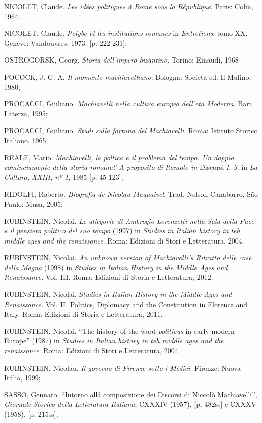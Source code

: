 \begin{Parskip}
NICOLET, Claude. \emph{Les idées politiques à Rome sous la République}.
Paris: Colin, 1964.

NICOLET, Claude. \emph{Polybe et les institutions romanes} in
\emph{Entretiens}, tomo XX. Geneve: Vandouvres, 1973. {[}p. 222-231{]};

OSTROGORSK, Georg. \emph{Storia dell'impero bizantino.} Torino: Einaudi,
1968

POCOCK, J. G. A. \emph{Il momento machiavelliano}. Bologna: Società ed.
Il Mulino, 1980;

PROCACCI, Giuliano. \emph{Machiavelli nella cultura europea dell'eta
Moderna}. Bari: Laterza, 1995;

PROCACCI, Guiliano. \emph{Studi sulla fortuna del Machiavelli}. Roma:
Istituto Storico Italiano. 1965;

REALE, Mario. \emph{Machiavelli, la poltica e il problema del tempo. Un
doppio cominciamente della storia romana? A proposito di Romolo in}
Discorsi \emph{I, 9}. in \emph{La Cultura, XXIII, nº 1,} 1985 {[}p.
45-123{]};

RIDOLFI, Roberto. \emph{Biografia de Nicolau Maquaivel}. Trad. Nelson
Canabarro, São Paulo: Musa, 2005;

RUBINSTEIN, Nicolai. \emph{Le allegorie di Ambrogio Lorenzetti nella
Sala della Pace e il pensiero político del suo tempo} (1997) in
\emph{Studies in Italian history in teh middle ages and the
renaissance}. Roma: Edizioni di Stori e Letteratura, 2004.

RUBINSTEIN, Nicolai. \emph{An unknown version of Machiavelli's Ritratto
delle cose della Magna} (1998) in \emph{Studies in Italian History in
the Middle Ages and Renaissance.} Vol. III. Roma: Edizioni di Storia e
Letteratura, 2012.

RUBINSTEIN, Nicolai. \emph{Studies in Italian History in the Middle Ages
and Renaissance.} Vol. II. Politics, Diplomacy and the Constitution in
Florence and Italy. Roma: Edizioni di Storia e Letteratura, 2011.

RUBINSTEIN, Nicolai. ``The history of the word \emph{politicus} in early
modern Europe'' (1987) in \emph{Studies in Italian history in teh middle
ages and the renaissance}. Roma: Edizioni di Stori e Letteratura, 2004.

RUBINSTEIN, Nicolau. \emph{Il governo di Firenze sotto i Médici}.
Firenze: Nuova Itália, 1999;

SASSO, Gennaro. ``Intorno allá composizione dei Discorsi di Niccolò
Machiavelli'', \emph{Giornale Storico della Letteratura Italiana},
CXXXIV (1957), {[}p. 482ss{]} e CXXXV (1958), {[}p. 215ss{]};


\end{Parskip}
